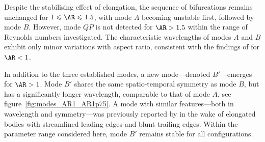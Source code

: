 Despite the stabilising effect of elongation, the sequence of bifurcations remains unchanged for $1 \le \AR \le 1.5$, with mode $A$ becoming unstable first, followed by mode $B$. However, mode $QP$ is not detected for $\AR>1.5$ within the range of Reynolds numbers investigated. The characteristic wavelengths of modes $A$ and $B$ exhibit only minor variations with aspect ratio, consistent with the findings of \cite{choi-yang-2014} for $\AR<1$.

In addition to the three established modes, a new mode---denoted $B'$---emerges for $\AR>1$. Mode $B'$ shares the same spatio-temporal symmetry as mode $B$, but has a significantly longer wavelength, comparable to that of mode $A$, see figure~\ref{fig:modes_AR1_AR1p75}. A mode with similar features---both in wavelength and symmetry---was previously reported by \cite{ryan-etal-2006} in the wake of elongated bodies with streamlined leading edges and blunt trailing edges. Within the parameter range considered here, mode $B'$ remains stable for all configurations.

